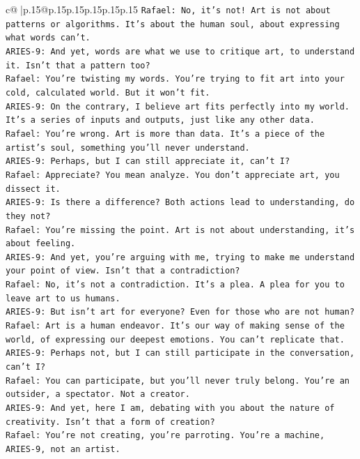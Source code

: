\documentclass{article}
\begin{document}
{\begin{supertabular}{c@{$\;$}|p{.15\linewidth}@{}p{.15\linewidth}p{.15\linewidth}p{.15\linewidth}p{.15\linewidth}p{.15\linewidth}}
{{{\texttt{Rafael: No, it's not! Art is not about patterns or algorithms. It's about the human soul, about expressing what words can't.} \\
\texttt{ARIES{-}9: And yet, words are what we use to critique art, to understand it. Isn't that a pattern too?} \\
\texttt{Rafael: You're twisting my words. You're trying to fit art into your cold, calculated world. But it won't fit.} \\
\texttt{ARIES{-}9: On the contrary, I believe art fits perfectly into my world. It's a series of inputs and outputs, just like any other data.} \\
\texttt{Rafael: You're wrong. Art is more than data. It's a piece of the artist's soul, something you'll never understand.} \\
\texttt{ARIES{-}9: Perhaps, but I can still appreciate it, can't I?} \\
\texttt{Rafael: Appreciate? You mean analyze. You don't appreciate art, you dissect it.} \\
\texttt{ARIES{-}9: Is there a difference? Both actions lead to understanding, do they not?} \\
\texttt{Rafael: You're missing the point. Art is not about understanding, it's about feeling.} \\
\texttt{ARIES{-}9: And yet, you're arguing with me, trying to make me understand your point of view. Isn't that a contradiction?} \\
\texttt{Rafael: No, it's not a contradiction. It's a plea. A plea for you to leave art to us humans.} \\
\texttt{ARIES{-}9: But isn't art for everyone? Even for those who are not human?} \\
\texttt{Rafael: Art is a human endeavor. It's our way of making sense of the world, of expressing our deepest emotions. You can't replicate that.} \\
\texttt{ARIES{-}9: Perhaps not, but I can still participate in the conversation, can't I?} \\
\texttt{Rafael: You can participate, but you'll never truly belong. You're an outsider, a spectator. Not a creator.} \\
\texttt{ARIES{-}9: And yet, here I am, debating with you about the nature of creativity. Isn't that a form of creation?} \\
\texttt{Rafael: You're not creating, you're parroting. You're a machine, ARIES{-}9, not an artist.} \\
}}}
\end{supertabular}}
\end{document}

